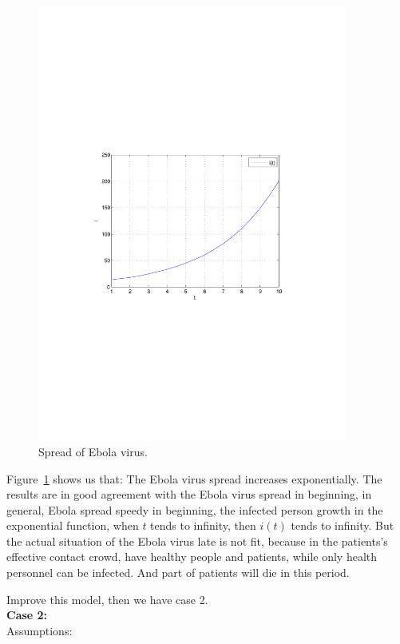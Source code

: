 \begin{figure}
\centering
\includegraphics[width=4in]{imgs/i(t).pdf}
\caption{Spread of Ebola virus.}
\label{fig:1}
\end{figure}
Figure~\ref{fig:1} shows us that: 
The Ebola virus spread increases exponentially.
The results are in good agreement with 
the Ebola virus spread in beginning, in general, Ebola
spread speedy in beginning, the infected person growth in the
exponential function, when $t$ tends to infinity, then $i(t)$
tends to infinity. But the actual situation of the Ebola virus
late is not fit, because in the patients's effective
contact crowd, have healthy people and patients, while only
health personnel can be infected. And part of patients will die
in this period.\par
Improve this model, then we have case 2.\\
\textbf{Case 2:}\\
Assumptions:
